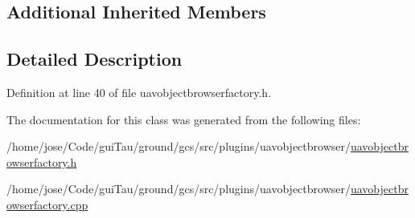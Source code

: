 \subsection*{Additional Inherited Members}


\subsection{Detailed Description}


Definition at line 40 of file uavobjectbrowserfactory.\-h.



The documentation for this class was generated from the following files\-:\begin{DoxyCompactItemize}
\item 
/home/jose/\-Code/gui\-Tau/ground/gcs/src/plugins/uavobjectbrowser/\hyperlink{uavobjectbrowserfactory_8h}{uavobjectbrowserfactory.\-h}\item 
/home/jose/\-Code/gui\-Tau/ground/gcs/src/plugins/uavobjectbrowser/\hyperlink{uavobjectbrowserfactory_8cpp}{uavobjectbrowserfactory.\-cpp}\end{DoxyCompactItemize}
